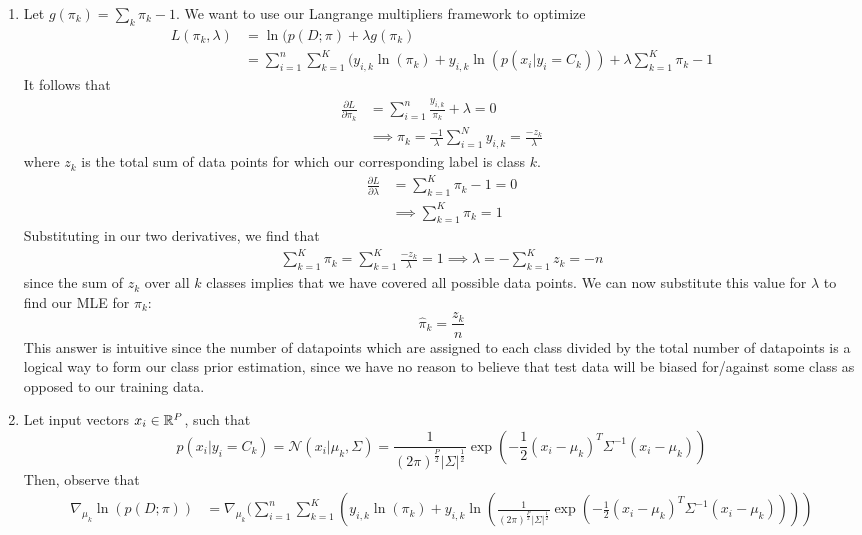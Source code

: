 \documentclass[submit]{harvardml}
\begin{document}
\begin{enumerate}
    \item
    Let $g(\pi_k) = \sum_k \pi_k - 1$. We want to use our Langrange multipliers framework to optimize 
    \begin{align}
        L(\pi_k, \lambda) &= \ln(p(D; \pi) + \lambda g(\pi_k) \\
        &= \sum_{i=1}^n \sum_{k=1}^K (y_{i,k}\ln(\pi_k) + y_{i,k}\ln(p(x_i | y_i = C_k)) + \lambda \sum_{k=1}^K \pi_k - 1
    \end{align}
     It follows that
     \begin{align}
         \frac{\partial L}{\partial\pi_k}&= \sum_{i=1}^n \frac{y_{i,k}}{\pi_k} + \lambda = 0 \\
         &\implies  \pi_k = \frac{-1}{\lambda}\sum_{i=1}^N y_{i,k} =  \frac{-z_k}{\lambda}
     \end{align}
     where $z_k$ is the total sum of data points for which our corresponding label is class $k$.
     \begin{align}
         \frac{\partial L}{\partial\lambda}&= \sum_{k=1}^K \pi_k - 1 = 0 \\
         &\implies  \sum_{k=1}^K \pi_k = 1
     \end{align}
     Substituting in our two derivatives, we find that
     \begin{align}
         \sum_{k=1}^K \pi_k = \sum_{k=1}^K \frac{-z_k}{\lambda} = 1 \implies \lambda = -\sum_{k=1}^K z_k = -n
     \end{align}
     since the sum of $z_k$ over all $k$ classes implies that we have covered all possible data points. We can now substitute this value for $\lambda$ to find our MLE for $\pi_k$:
     $$\hat\pi_k = \frac{z_k}{n}$$
     This answer is intuitive since the number of datapoints which are assigned to each class divided by the total number of datapoints is a logical way to form our class prior estimation, since we have no reason to believe that test data will be biased for/against some class as opposed to our training data. 
     \item Let input vectors $x_i \in \mathbb{R}^P$, such that $$p(x_i | y_i = C_k) = \mathcal{N}(x_i |  \mu_k, \Sigma) = \frac{1}{(2\pi)^{\frac{P}{2}}|\Sigma|^\frac{1}{2}}\exp(-\frac{1}{2}(x_i- \mu_k)^T\Sigma^{-1}(x_i-\mu_k))$$
     Then, observe that
     \begin{align}
         \nabla_{\mu_k}\ln(p(D;\pi)) &= \nabla_{\mu_k}(\sum_{i=1}^n \sum_{k=1}^K (y_{i,k}\ln(\pi_k) + y_{i,k}\ln(\frac{1}{(2\pi)^{\frac{P}{2}}|\Sigma|^\frac{1}{2}}\exp(-\frac{1}{2}(x_i- \mu_k)^T\Sigma^{-1}(x_i-\mu_k)))) \\

\end{align}
\end{enumerate}
\end{document}

